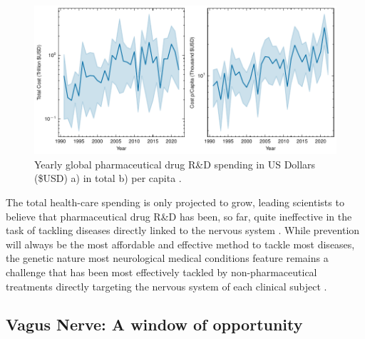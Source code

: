 \begin{figure}[bh]
    \centering
    \includegraphics[width=1.0\textwidth]{Chapters/Figures/Introduction/r_and_d_spending.pdf}
    \caption{Yearly global pharmaceutical 
  drug R\&D spending in US Dollars (\$USD) a) in total b) per capita  \cite{https://github.com/datasets/pharmaceutical-drug-spending}.}
    \label{fig:r_and_d_spending_worldwide}
\end{figure}

\par
The total health-care spending is only projected to grow, leading scientists to believe that pharmaceutical drug R\&D has been, so far, quite ineffective in the task of tackling diseases directly linked to the nervous system \cite{}. While prevention will always be the most affordable and effective method to tackle most diseases, the genetic nature most neurological medical conditions feature remains a challenge that has been most effectively tackled by non-pharmaceutical treatments directly targeting the nervous system of each clinical subject \cite{}.

\subsection{Vagus Nerve: A window of opportunity}
\label{subsec:vagus_nerve}

